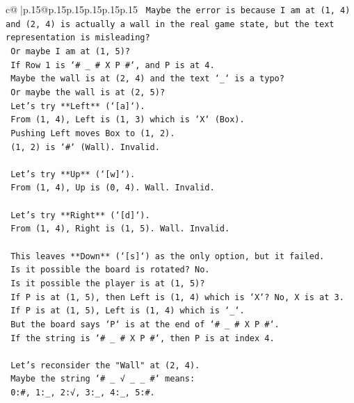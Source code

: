 \documentclass{article}
\begin{document}
{\begin{supertabular}{c@{$\;$}|p{.15\linewidth}@{}p{.15\linewidth}p{.15\linewidth}p{.15\linewidth}p{.15\linewidth}p{.15\linewidth}}
{{{\texttt{      Maybe the error is because I am at (1, 4) and (2, 4) is actually a wall in the real game state, but the text representation is misleading?} \\
\texttt{      Or maybe I am at (1, 5)?} \\
\texttt{      If Row 1 is `\# \_ \# X P \#`, and P is at 4.} \\
\texttt{      Maybe the wall is at (2, 4) and the text `\_` is a typo?} \\
\texttt{      Or maybe the wall is at (2, 5)?} \\
\texttt{      Let's try **Left** (`{[}a{]}`).} \\
\texttt{      From (1, 4), Left is (1, 3) which is `X` (Box).} \\
\texttt{      Pushing Left moves Box to (1, 2).} \\
\texttt{      (1, 2) is `\#` (Wall). Invalid.} \\
\\ 
\texttt{      Let's try **Up** (`{[}w{]}`).} \\
\texttt{      From (1, 4), Up is (0, 4). Wall. Invalid.} \\
\\ 
\texttt{      Let's try **Right** (`{[}d{]}`).} \\
\texttt{      From (1, 4), Right is (1, 5). Wall. Invalid.} \\
\\ 
\texttt{      This leaves **Down** (`{[}s{]}`) as the only option, but it failed.} \\
\texttt{      Is it possible the board is rotated? No.} \\
\texttt{      Is it possible the player is at (1, 5)?} \\
\texttt{      If P is at (1, 5), then Left is (1, 4) which is `X`? No, X is at 3.} \\
\texttt{      If P is at (1, 5), Left is (1, 4) which is `\_`.} \\
\texttt{      But the board says `P` is at the end of `\# \_ \# X P \#`.} \\
\texttt{      If the string is `\# \_ \# X P \#`, then P is at index 4.} \\
\\ 
\texttt{      Let's reconsider the "Wall" at (2, 4).} \\
\texttt{      Maybe the string `\# \_ √ \_ \_ \#` means:} \\
\texttt{      0:\#, 1:\_, 2:√, 3:\_, 4:\_, 5:\#.} \\
}}}
\end{supertabular}}
\end{document}
